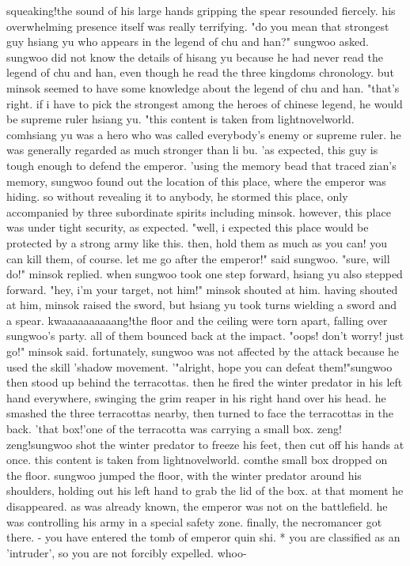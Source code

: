 squeaking!the sound of his large hands gripping the spear resounded fiercely.
 his overwhelming presence itself was really terrifying.
"do you mean that strongest guy hsiang yu who appears in the legend of chu and han?" sungwoo asked.
 sungwoo did not know the details of hisang yu because he had never read the legend of chu and han, even though he read the three kingdoms chronology.
 but minsok seemed to have some knowledge about the legend of chu and han.
 "that's right.
 if i have to pick the strongest among the heroes of chinese legend, he would be supreme ruler hsiang yu.
"this content is taken from lightnovelworld.
comhsiang yu was a hero who was called everybody's enemy or supreme ruler.
 he was generally regarded as much stronger than li bu.
'as expected, this guy is tough enough to defend the emperor.
'using the memory bead that traced zian's memory, sungwoo found out the location of this place, where the emperor was hiding.
 so without revealing it to anybody, he stormed this place, only accompanied by three subordinate spirits including minsok.
however, this place was under tight security, as expected.
"well, i expected this place would be protected by a strong army like this.
 then, hold them as much as you can! you can kill them, of course.
 let me go after the emperor!" said sungwoo.
"sure, will do!" minsok replied.
when sungwoo took one step forward, hsiang yu also stepped forward.
 "hey, i'm your target, not him!" minsok shouted at him.
having shouted at him, minsok raised the sword, but hsiang yu took turns wielding a sword and a spear.
kwaaaaaaaaaang!the floor and the ceiling were torn apart, falling over sungwoo's party.
 all of them bounced back at the impact.
"oops! don't worry! just go!" minsok said.
fortunately, sungwoo was not affected by the attack because he used the skill 'shadow movement.
'"alright, hope you can defeat them!"sungwoo then stood up behind the terracottas.
 then he fired the winter predator in his left hand everywhere, swinging the grim reaper in his right hand over his head.
he smashed the three terracottas nearby, then turned to face the terracottas in the back.
'that box!'one of the terracotta was carrying a small box.
 zeng! zeng!sungwoo shot the winter predator to freeze his feet, then cut off his hands at once.
 this content is taken from lightnovelworld.
comthe small box dropped on the floor.
 sungwoo jumped the floor, with the winter predator around his shoulders, holding out his left hand to grab the lid of the box.
 at that moment he disappeared.
as was already known, the emperor was not on the battlefield.
 he was controlling his army in a special safety zone.
 finally, the necromancer got there.
- you have entered the tomb of emperor quin shi.
* you are classified as an 'intruder', so you are not forcibly expelled.
 whoo-

